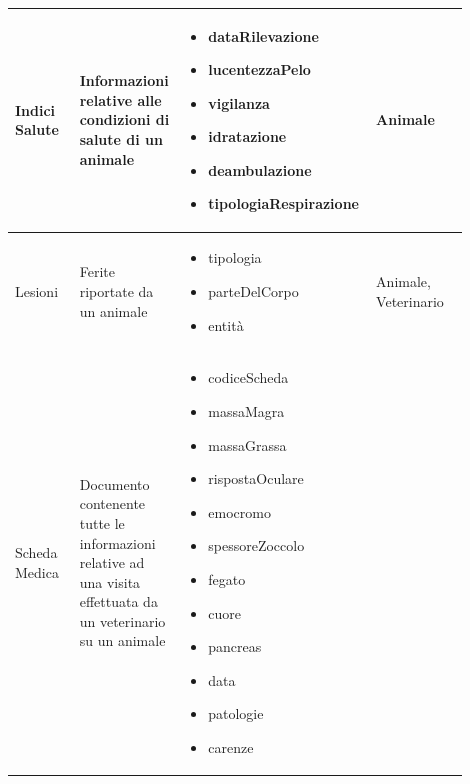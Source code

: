 \documentclass[12pt,a4paper]{article}
\begin{document}
\begin{center}
\begin{longtable}{|p{0.14\linewidth}|p{0.20\linewidth}|p{0.36\linewidth}|p{0.20\linewidth}|}
\hline
Indici Salute				 	&  Informazioni relative alle condizioni di salute di un animale 
					& \begin{itemize}
						\setlength{\itemindent}{-1em}
						\vspace{-25pt}
						\setlength\itemsep{-0.25em}
						\item dataRilevazione
						\item lucentezzaPelo
						\item vigilanza
						\item idratazione
						\item deambulazione
						\item tipologiaRespirazione
						
					\end{itemize}
					&  Animale  \\ 

\hline
Lesioni				 	&  Ferite riportate da un animale 
					& \begin{itemize}
						\setlength{\itemindent}{-1em}
						\vspace{-25pt}
						\setlength\itemsep{-0.25em}
						\item tipologia
						\item parteDelCorpo
						\item entità
					\end{itemize}
					&  Animale, Veterinario  \\ 

\hline
Scheda Medica				 	&  Documento contenente tutte le informazioni relative ad una visita effettuata da un veterinario su un animale 
					& \begin{itemize}
						\setlength{\itemindent}{-1em}
						\vspace{-25pt}
						\setlength\itemsep{-0.25em}
						\item codiceScheda
						\item massaMagra
						\item massaGrassa
						\item rispostaOculare
						\item emocromo
						\item spessoreZoccolo
						\item fegato
						\item cuore
						\item pancreas
						\item data
						\item patologie
						\item carenze
						

\end{itemize}
\end{longtable}
\end{center}
\end{document}
